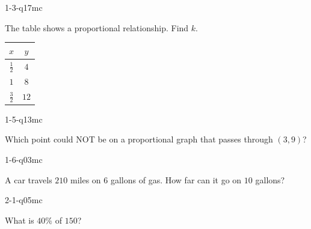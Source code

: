 
\begin{practiceQuestion}{1-3-q17}{mc}
\begin{questionText}
The table shows a proportional relationship. Find $k$.

\begin{center}
\begin{tabular}{|c|c|}
\hline $x$ & $y$ \\ \hline $\frac{1}{2}$ & $4$ \\ $1$ & $8$ \\ $\frac{3}{2}$ & $12$ \\ \hline
\end{tabular}
\end{center}
\end{questionText}
\end{practiceQuestion}

\begin{practiceQuestion}{1-5-q13}{mc}
\begin{questionText}
Which point could NOT be on a proportional graph that passes through $(3, 9)$?
\end{questionText}
\end{practiceQuestion}

\begin{practiceQuestion}{1-6-q03}{mc}
\begin{questionText}
A car travels $210$ miles on $6$ gallons of gas. How far can it go on $10$ gallons?
\end{questionText}
\end{practiceQuestion}

\begin{practiceQuestion}{2-1-q05}{mc}
\begin{questionText}
What is $40\%$ of $150$?
\end{questionText}
\end{practiceQuestion}

